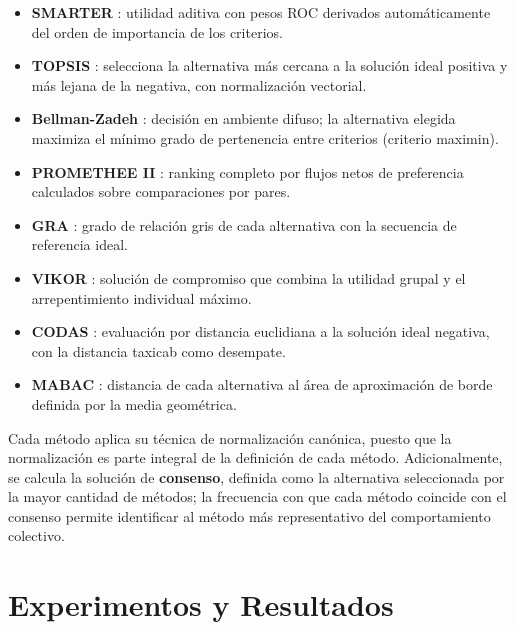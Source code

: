 \documentclass[sigplan,screen]{acmart}
\begin{document}
\begin{itemize}
    \item \textbf{SMARTER} \cite{Edwards1994}: utilidad aditiva con pesos ROC derivados automáticamente del orden de importancia de los criterios.
    \item \textbf{TOPSIS} \cite{Hwang1981}: selecciona la alternativa más cercana a la solución ideal positiva y más lejana de la negativa, con normalización vectorial.
    \item \textbf{Bellman-Zadeh} \cite{Bellman1970}: decisión en ambiente difuso; la alternativa elegida maximiza el mínimo grado de pertenencia entre criterios (criterio maximin).
    \item \textbf{PROMETHEE II} \cite{Brans1985}: ranking completo por flujos netos de preferencia calculados sobre comparaciones por pares.
    \item \textbf{GRA} \cite{Deng1989}: grado de relación gris de cada alternativa con la secuencia de referencia ideal.
    \item \textbf{VIKOR} \cite{Opricovic2004}: solución de compromiso que combina la utilidad grupal y el arrepentimiento individual máximo.
    \item \textbf{CODAS} \cite{KeshavarzGhorabaee2016}: evaluación por distancia euclidiana a la solución ideal negativa, con la distancia taxicab como desempate.
    \item \textbf{MABAC} \cite{Pamucar2015}: distancia de cada alternativa al área de aproximación de borde definida por la media geométrica.
\end{itemize}

Cada método aplica su técnica de normalización canónica, puesto que la normalización es parte integral de la definición de cada método. Adicionalmente, se calcula la solución de \textbf{consenso}, definida como la alternativa seleccionada por la mayor cantidad de métodos; la frecuencia con que cada método coincide con el consenso permite identificar al método más representativo del comportamiento colectivo.

\section{Experimentos y Resultados}
\label{sec:experimentos}

\end{document}
